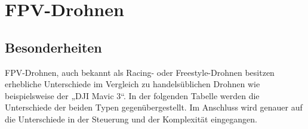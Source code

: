 
\section[FPV-Drohnen]{FPV-Drohnen}
    \subsection[Besonderheiten]{Besonderheiten}
        FPV-Drohnen, auch bekannt als Racing- oder Freestyle-Drohnen  besitzen erhebliche Unterschiede
        im Vergleich zu handelsüblichen Drohnen wie beispielsweise der „DJI Mavic 3“. In der folgenden
        Tabelle werden die Unterschiede der beiden Typen gegenübergestellt. Im Anschluss wird genauer
        auf die Unterschiede in der Steuerung und der Komplexität eingegangen.

